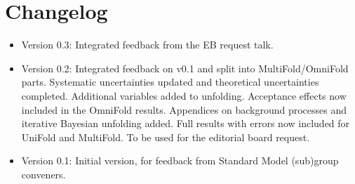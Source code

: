 \section{Changelog}

\begin{itemize}
\item Version 0.3: Integrated feedback from the EB request talk.
\item Version 0.2: Integrated feedback on v0.1 and split into MultiFold/OmniFold parts. Systematic uncertainties updated and theoretical uncertainties completed. Additional variables added to unfolding. Acceptance effects now included in the OmniFold results. Appendices on background processes and iterative Bayesian unfolding added.  Full results with errors now included for UniFold and MultiFold. To be used for the editorial board request.
\item Version 0.1: Initial version, for feedback from Standard Model (sub)group conveners.
\end{itemize}

